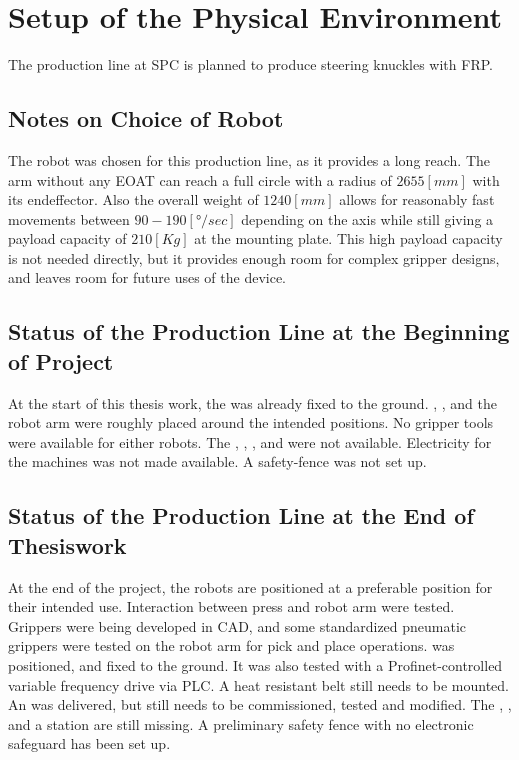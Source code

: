 \chapter{Setup of the Physical Environment}
The production line at \ac{SPC} is planned to produce steering knuckles with \ac{FRP}.



\section{Notes on Choice of Robot} %
The robot was chosen for this production line, as it provides a long reach. The arm without any \ac{EOAT} can reach a full circle with a radius of $2655 [\textit{mm}]$ with its \gls{endeffector}. Also the overall weight of $1240 [\textit{mm}]$ allows for reasonably fast movements between $90-190 [\textit{°/sec}] $ depending on the axis while still giving a payload capacity of $210 [\textit{Kg}]$ at the mounting plate.\cite{210FDatasheet}
This high payload capacity is not needed directly, but it provides enough room for complex gripper designs, and leaves room for future uses of the device.

\section{Status of the Production Line at the Beginning of Project}
At the start of this thesis work, the  was already fixed to the ground. 
, , and the robot arm were roughly placed around the intended positions. %
No gripper tools were available for either robots.
The , , ,  and  were not available.
Electricity for the machines was not made available.
A safety-fence was not set up.

\section{Status of the Production Line at the End of Thesiswork}
At the end of the project, the robots are positioned at a preferable position for their intended use. Interaction between press and robot arm were tested. Grippers were being developed in \ac{CAD}, and some standardized pneumatic grippers were tested on the robot arm for pick and place operations.  was positioned, and fixed to the ground. It was also tested with a Profinet-controlled variable frequency drive via \ac{PLC}. A heat resistant belt still needs to be mounted. An  was delivered, but still needs to be commissioned, tested and modified. The , ,  and a  station are still missing.
A preliminary safety fence with no electronic safeguard has been set up. 


